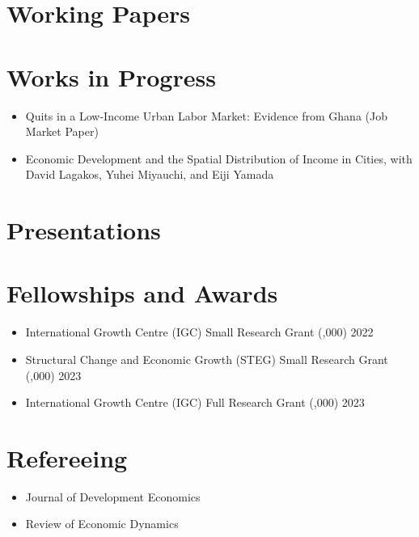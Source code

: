 \documentclass[12pt]{article}
\newenvironment{customitemize}
{ \begin{itemize}[
	leftmargin=\parindent,
	itemindent=-0.5\parindent,
	topsep = 0pt, 
	itemsep = -1pt, 
	label={}] }
{\end{itemize} }
\begin{document}
\section*{Working Papers}
\vspace{5pt}

\section*{Works in Progress}

\begin{customitemize}
	\item Quits in a Low-Income Urban Labor Market: Evidence from Ghana (Job Market Paper)
	\item Economic Development and the Spatial Distribution of Income in Cities, with David Lagakos, Yuhei Miyauchi, and Eiji Yamada
\end{customitemize}

\section*{Presentations}
\vspace{5pt}


\section*{Fellowships and Awards}


\begin{customitemize}
	\item International Growth Centre (IGC) Small Research Grant (,000) \hfill 2022
	\item Structural Change and Economic Growth (STEG) Small Research Grant (,000) \hfill 2023
	\item International Growth Centre (IGC) Full Research Grant (,000) \hfill 2023
\end{customitemize}

\section*{Refereeing}


\begin{customitemize}
	\item Journal of Development Economics
	\item Review of Economic Dynamics
\end{customitemize}
\end{document}
